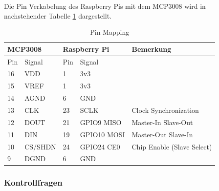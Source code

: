 \documentclass{article}
\begin{document}
Die Pin Verkabelung des Raspberry Pis mit dem MCP3008 wird in nachstehender Tabelle \ref{tab:Verkabelung} dargestellt. 
\begin{table}[h!]
    \begin{tabular}{|l|l|l|l|l|}
    \hline
    \multicolumn{2}{|l|}{\textbf{MCP3008}} & \multicolumn{2}{l|}{\textbf{Raspberry Pi}} & \textbf{Bemerkung}         \\ \hline
    Pin         & Signal          & Pin         & Signal              &                            \\ \hline
    16          & VDD             & 1           & 3v3                 &                            \\ \hline
    15          & VREF            & 1           & 3v3                 &                            \\ \hline
    14          & AGND            & 6           & GND                 &                            \\ \hline
    13          & CLK             & 23          & SCLK                & Clock Synchronization      \\ \hline
    12          & DOUT            & 21          & GPIO9 MISO          & Master-In Slave-Out        \\ \hline
    11          & DIN             & 19          & GPIO10 MOSI         & Master-Out Slave-In        \\ \hline
    10          & CS/SHDN         & 24          & GPIO24 CE0          & Chip Enable (Slave Select) \\ \hline
    9           & DGND            & 6           & GND                 &                            \\ \hline
    \end{tabular}
    \caption{Pin Mapping}
    \label{tab:Verkabelung}
\end{table}

\newpage
\subsubsection{Kontrollfragen}
\end{document}
